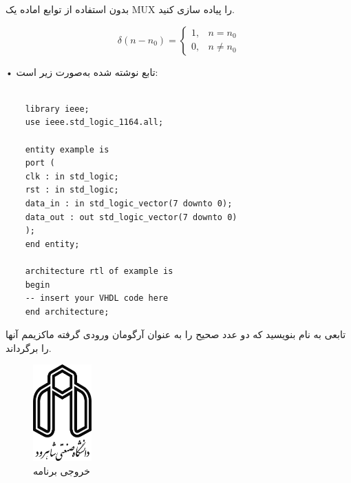 \documentclass[12pt]{exam}
\begin{document}
\begin{questions}

\question
بدون استفاده از توابع اماده یک MUX را پیاده سازی کنید.

$$
\delta(n-n_0)=\begin{cases}
	1, & \text{$n=n_0$}\\
	0, & \text{$n\neq n_0$}
\end{cases}
$$

• تابع نوشته شده به‌صورت زیر است: 
\begin{latin}
\begin{lstlisting}[style=vhdl,caption={Example VHDL code}]
	
	library ieee;
	use ieee.std_logic_1164.all;
	
	entity example is
	port (
	clk : in std_logic;
	rst : in std_logic;
	data_in : in std_logic_vector(7 downto 0);
	data_out : out std_logic_vector(7 downto 0)
	);
	end entity;
	
	architecture rtl of example is
	begin
	-- insert your VHDL code here
	end architecture;
\end{lstlisting}
\end{latin}


\question 
تابعی به نام 
بنویسید که دو عدد صحیح را به عنوان آرگومان ورودی گرفته ماکزیمم آنها را برگرداند.


\begin{figure}[h]
	\centering
	\includegraphics[width=0.2\textwidth]{images/logo}
	\caption{خروجی برنامه}
\end{figure}

\end{questions}
\end{document}

